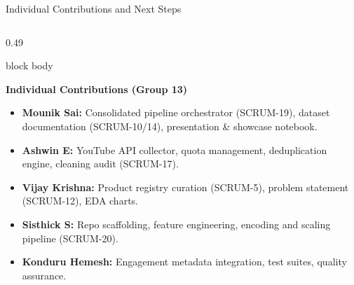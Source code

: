 \documentclass[aspectratio=169, 10pt]{beamer}
\newenvironment{card}[1][]{%
    \begin{beamercolorbox}[rounded=true,shadow=false,wd=\linewidth,sep=4pt,#1]{block body}%
}{%
    \end{beamercolorbox}%
}
\begin{document}
\begin{frame}{Individual Contributions and Next Steps}
    \begin{columns}[T]
        \begin{column}{0.49\textwidth}
            \begin{card}
                {\fontsize{8.5pt}{10pt}\selectfont \textbf{\color{NavyPrimary}Individual Contributions (Group 13)}}\\[0.08cm]
                \begin{itemize}\setlength{\itemsep}{2pt}
                    \item \textbf{Mounik Sai:} Consolidated pipeline orchestrator (SCRUM-19), dataset documentation (SCRUM-10/14), presentation \& showcase notebook.
                    \item \textbf{Ashwin E:} YouTube API collector, quota management, deduplication engine, cleaning audit (SCRUM-17).
                    \item \textbf{Vijay Krishna:} Product registry curation (SCRUM-5), problem statement (SCRUM-12), EDA charts.
                    \item \textbf{Sisthick S:} Repo scaffolding, feature engineering, encoding and scaling pipeline (SCRUM-20).
                    \item \textbf{Konduru Hemesh:} Engagement metadata integration, test suites, quality assurance.
                \end{itemize}
            \end{card}
        \end{column}


\end{columns}
\end{frame}
\end{document}
